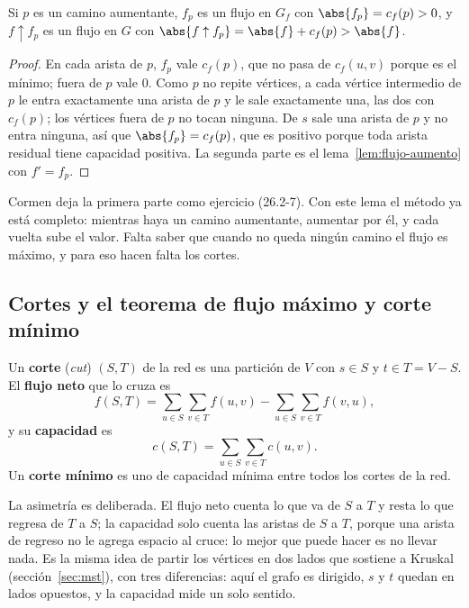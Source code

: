 \documentclass[11pt,letterpaper]{article}
\begin{document}
\begin{lema}\label{lem:flujo-camino}
  Si $p$ es un camino aumentante, $f_p$ es un flujo en $G_f$ con
  $\abs{f_p} = c_f(p) > 0$, y $f \uparrow f_p$ es un flujo en $G$ con
  $\abs{f \uparrow f_p} = \abs{f} + c_f(p) > \abs{f}$.
\end{lema}

\begin{proof}
  En cada arista de $p$, $f_p$ vale $c_f(p)$, que no pasa de
  $c_f(u, v)$ porque es el mínimo; fuera de $p$ vale $0$. Como $p$ no
  repite vértices, a cada vértice intermedio de $p$ le entra
  exactamente una arista de $p$ y le sale exactamente una, las dos con
  $c_f(p)$; los vértices fuera de $p$ no tocan ninguna. De $s$ sale una
  arista de $p$ y no entra ninguna, así que $\abs{f_p} = c_f(p)$, que
  es positivo porque toda arista residual tiene capacidad positiva. La
  segunda parte es el lema~\ref{lem:flujo-aumento} con $f' = f_p$.
\end{proof}

Cormen deja la primera parte como ejercicio (26.2-7). Con este lema el
método ya está completo: mientras haya un camino aumentante, aumentar
por él, y cada vuelta sube el valor. Falta saber que cuando no queda
ningún camino el flujo es máximo, y para eso hacen falta los cortes.


\subsection*{Cortes y el teorema de flujo máximo y corte mínimo}

\begin{definicion}[Corte]
  Un \textbf{corte} (\textit{cut}) $(S, T)$ de la red es una
  partición de $V$ con $s \in S$ y $t \in T = V - S$. El
  \textbf{flujo neto} que lo cruza es
  \[
    f(S, T) = \sum_{u \in S} \sum_{v \in T} f(u, v)
            - \sum_{u \in S} \sum_{v \in T} f(v, u) ,
  \]
  y su \textbf{capacidad} es
  \[
    c(S, T) = \sum_{u \in S} \sum_{v \in T} c(u, v) .
  \]
  Un \textbf{corte mínimo} es uno de capacidad mínima entre todos los
  cortes de la red.
\end{definicion}

La asimetría es deliberada. El flujo neto cuenta lo que va de $S$ a
$T$ y resta lo que regresa de $T$ a $S$; la capacidad solo cuenta las
aristas de $S$ a $T$, porque una arista de regreso no le agrega
espacio al cruce: lo mejor que puede hacer es no llevar nada. Es la
misma idea de partir los vértices en dos lados que sostiene a Kruskal
(sección~\ref{sec:mst}), con tres diferencias: aquí el grafo es
dirigido, $s$ y $t$ quedan en lados opuestos, y la capacidad mide un
solo sentido.
\end{document}
